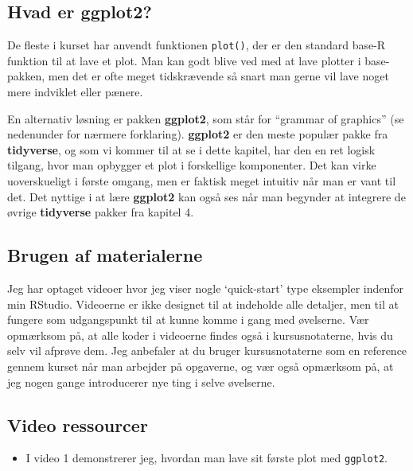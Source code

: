 \documentclass[
]{book}
\providecommand{\tightlist}{%
  \setlength{\itemsep}{0pt}\setlength{\parskip}{0pt}}
\begin{document}
\hypertarget{hvad-er-ggplot2}{%
\subsection{\texorpdfstring{Hvad er \textbf{ggplot2}?}{Hvad er ggplot2?}}\label{hvad-er-ggplot2}}

De fleste i kurset har anvendt funktionen \texttt{plot()}, der er den standard base-R funktion til at lave et plot. Man kan godt blive ved med at lave plotter i base-pakken, men det er ofte meget tidskrævende så snart man gerne vil lave noget mere indviklet eller pænere.

En alternativ løsning er pakken \textbf{ggplot2}, som står for ``grammar of graphics'' (se nedenunder for nærmere forklaring). \textbf{ggplot2} er den meste populær pakke fra \textbf{tidyverse}, og som vi kommer til at se i dette kapitel, har den en ret logisk tilgang, hvor man opbygger et plot i forskellige komponenter. Det kan virke uoverskueligt i første omgang, men er faktisk meget intuitiv når man er vant til det. Det nyttige i at lære \textbf{ggplot2} kan også ses når man begynder at integrere de øvrige \textbf{tidyverse} pakker fra kapitel 4.

\hypertarget{brugen-af-materialerne}{%
\subsection{Brugen af materialerne}\label{brugen-af-materialerne}}

Jeg har optaget videoer hvor jeg viser nogle `quick-start' type eksempler indenfor min RStudio. Videoerne er ikke designet til at indeholde alle detaljer, men til at fungere som udgangspunkt til at kunne komme i gang med øvelserne. Vær opmærksom på, at alle koder i videoerne findes også i kursusnotaterne, hvis du selv vil afprøve dem. Jeg anbefaler at du bruger kursusnotaterne som en reference gennem kurset når man arbejder på opgaverne, og vær også opmærksom på, at jeg nogen gange introducerer nye ting i selve øvelserne.

\hypertarget{video-ressourcer}{%
\subsection{Video ressourcer}\label{video-ressourcer}}

\begin{itemize}
\tightlist
\item
  I video 1 demonstrerer jeg, hvordan man lave sit første plot med \texttt{ggplot2}.
\end{itemize}
\end{document}
